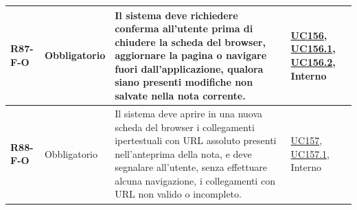 \begin{longtable}{|p{2.5cm}|p{2.2cm}|p{6.8cm}|p{2.7cm}|}
	\textbf{R87-F-O} & Obbligatorio & Il sistema deve richiedere conferma all'utente prima di chiudere la scheda del browser, aggiornare la pagina o navigare fuori dall'applicazione, qualora siano presenti modifiche non salvate nella nota corrente. & \hyperlink{uc156}{UC156}, \hyperlink{uc156.1}{UC156.1}, \hyperlink{uc156.2}{UC156.2}, Interno \\ \hline
	\textbf{R88-F-O} & Obbligatorio & Il sistema deve aprire in una nuova scheda del browser i collegamenti ipertestuali con URL assoluto presenti nell'anteprima della nota, e deve segnalare all'utente, senza effettuare alcuna navigazione, i collegamenti con URL non valido o incompleto. & \hyperlink{uc157}{UC157}, \hyperlink{uc157.1}{UC157.1}, Interno \\ \hline

\end{longtable}

